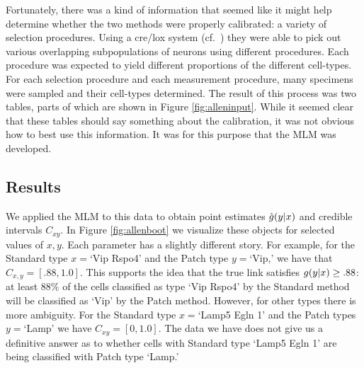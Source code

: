 Fortunately, there was a kind of information that seemed like it might help determine whether the two methods were properly calibrated: a variety of selection procedures.  Using a cre/lox system (cf.\ \citep{tasic2017shared}) they were able to pick out various overlapping subpopulations of neurons using different procedures.  Each procedure was expected to yield different proportions of the different cell-types.  For each selection procedure and each measurement procedure, many specimens were sampled and their cell-types determined.  The result of this process was two tables, parts of which are shown in Figure \ref{fig:alleninput}.  While it seemed clear that these tables should say something about the calibration, it was not obvious how to best use this information.  It was for this purpose that the MLM was developed.

\subsection{Results}


We applied the MLM to this data to obtain point estimates $\hat {g}(y|x)$ and credible intervals $C_{x y}$.  In Figure \ref{fig:allenboot} we visualize these objects for selected values of $x,y$.  Each parameter has a slightly different story.  For example, for the Standard type $x=$`Vip Rspo4' and the Patch type $y=$`Vip,' we have that $C_{x,y}=[.88,1.0]$.  This supports the idea that the true link satisfies $g(y|x)\geq .88$: at least 88\% of the cells classified as type `Vip Rspo4' by the Standard method will be classified as `Vip' by the Patch method.  However, for other types there is more ambiguity.  For the Standard type $x=$`Lamp5 Egln 1' and the Patch types $y=$`Lamp' we have $C_{x y}=[0,1.0]$.  The data we have does not give us a definitive answer as to whether cells with Standard type `Lamp5 Egln 1' are being classified with Patch type `Lamp.'

